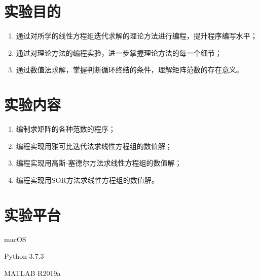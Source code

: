 






\newcommand{\ThisProjectTitle}{解线性方程组的迭代法}
\newcommand{\ThisDate}{2017-11-28}
\newcommand{\ThisNo}{No.2}






\section{实验目的}
\begin{enumerate}[leftmargin=1.4cm, itemsep=-0.5mm]
    \item 通过对所学的线性方程组迭代求解的理论方法进行编程，提升程序编写水平；
    \item 通过对理论方法的编程实验，进一步掌握理论方法的每一个细节；
    \item 通过数值法求解，掌握判断循环终结的条件，理解矩阵范数的存在意义。
    
\end{enumerate}

\section{实验内容}
\begin{enumerate}[leftmargin=1.4cm, itemsep=-0.5mm]
    \item 编制求矩阵的各种范数的程序；
    \item 编程实现用雅可比迭代法求线性方程组的数值解；
    \item 编程实现用高斯-塞德尔方法求线性方程组的数值解；
    \item 编程实现用SOR方法求线性方程组的数值解。
\end{enumerate}

\section{实验平台}

macOS

Python 3.7.3

MATLAB R2019a

